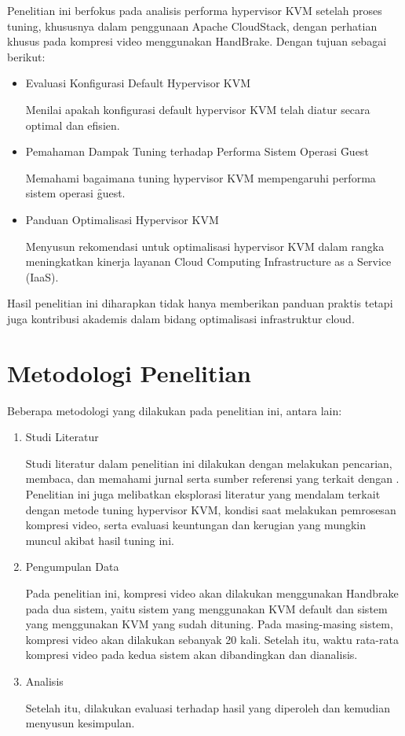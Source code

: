 Penelitian ini berfokus pada analisis performa hypervisor KVM setelah proses tuning, khususnya dalam penggunaan Apache CloudStack, dengan perhatian khusus pada kompresi video menggunakan HandBrake. Dengan tujuan sebagai berikut:

\begin{itemize}
	\item Evaluasi Konfigurasi Default Hypervisor KVM
	
	Menilai apakah konfigurasi default hypervisor KVM telah diatur secara optimal dan efisien.
	
	\item Pemahaman Dampak Tuning terhadap Performa Sistem Operasi \f{Guest}
	
	Memahami bagaimana tuning hypervisor KVM mempengaruhi performa sistem operasi \f{guest}.
	
	\item Panduan Optimalisasi Hypervisor KVM
	
	Menyusun rekomendasi untuk optimalisasi hypervisor KVM dalam rangka meningkatkan kinerja layanan Cloud Computing Infrastructure as a Service (IaaS).
\end{itemize}
Hasil penelitian ini diharapkan tidak hanya memberikan panduan praktis tetapi juga kontribusi akademis dalam bidang optimalisasi infrastruktur cloud.

\section{Metodologi Penelitian}
Beberapa metodologi yang dilakukan pada penelitian ini, antara lain:
\begin{enumerate}
  \item Studi Literatur
  
  Studi literatur dalam penelitian ini dilakukan dengan melakukan pencarian, membaca, dan memahami jurnal serta sumber referensi yang terkait dengan \cc. Penelitian ini juga melibatkan eksplorasi literatur yang mendalam terkait dengan metode tuning hypervisor KVM, kondisi saat melakukan pemrosesan kompresi video, serta evaluasi keuntungan dan kerugian yang mungkin muncul akibat hasil tuning ini.
  
  \item Pengumpulan Data
  
  Pada penelitian ini, kompresi video akan dilakukan menggunakan Handbrake pada dua sistem, yaitu sistem yang menggunakan KVM default dan sistem yang menggunakan KVM yang sudah dituning. Pada masing-masing sistem, kompresi video akan dilakukan sebanyak 20 kali. Setelah itu, waktu rata-rata kompresi video pada kedua sistem akan dibandingkan dan dianalisis.
  
  \item Analisis
  
  Setelah itu, dilakukan evaluasi terhadap hasil yang diperoleh dan kemudian menyusun kesimpulan.
\end{enumerate}



